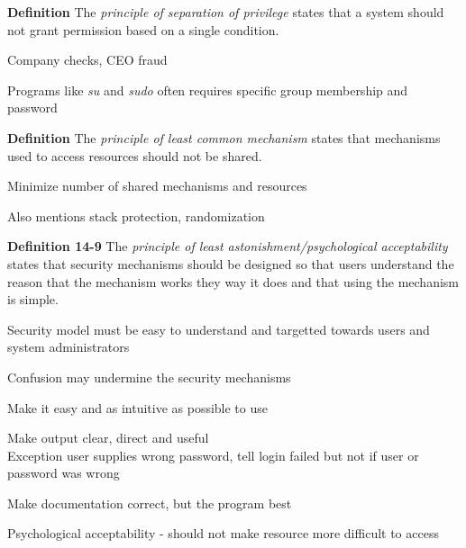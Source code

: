 \documentclass[Screen16to9,17pt]{foils}
\begin{document}

\begin{list1}
\item {\bf Definition} The \emph{principle of separation of privilege} states that a system should not grant permission based on a single condition.
\item Company checks, CEO fraud
\item Programs like \emph{su} and \emph{sudo} often requires specific group membership and password
\end{list1}



\begin{list1}
\item {\bf Definition} The \emph{principle of least common mechanism} states that mechanisms used to access resources should not be shared.
\item Minimize number of shared mechanisms and resources
\item Also mentions stack protection, randomization
\end{list1}




\begin{list1}
\item {\bf Definition 14-9} The \emph{principle of least astonishment/psychological acceptability} states that security mechanisms should be designed so that users understand the reason that the mechanism works they way it does and that using the mechanism is simple.
\item Security model must be easy to understand and targetted towards users and system administrators
\item Confusion may undermine the security mechanisms
\item Make it easy and as intuitive as possible to use
\item Make output clear, direct and useful\\
Exception user supplies wrong password, tell login failed but not if user or password was wrong
\item Make documentation correct, but the program best
\item Psychological acceptability - should not make resource more difficult to access
\end{list1}
\end{document}

